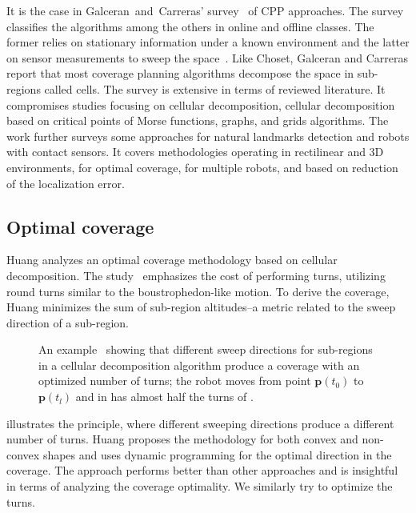 It is the case in Galceran~and~Carreras' survey~\citep{galceran2013survey} of CPP approaches. The survey classifies the algorithms among the others in online and offline classes. The former relies on stationary information under a known environment and the latter on sensor measurements to sweep the space~\citep{galceran2013survey}. Like Choset, Galceran and Carreras report that most coverage planning algorithms decompose the space in sub-regions called cells. The survey is extensive in terms of reviewed literature. It compromises studies focusing on cellular decomposition, cellular decomposition based on critical points of Morse functions, graphs, and grids algorithms. The work further surveys some approaches for natural landmarks detection and robots with contact sensors. It covers methodologies operating in rectilinear and 3D environments, for optimal coverage, for multiple robots, and based on reduction of the localization error.

\subsection{Optimal coverage}
\label{sec:opti-cov}

Huang analyzes an optimal coverage methodology based on cellular decomposition. The study~\citep{huang2001optimal} emphasizes the cost of performing turns, utilizing round turns similar to the boustrophedon-like motion. To derive the coverage, Huang minimizes the sum of sub-region altitudes--a metric related to the sweep direction of a sub-region. 
\begin{figure}[h]
  \centering
  \selectfont
  
  \caption[Turn optimal coverage with different sweep directions for each sub-region]{An example~\citep{huang2001optimal} showing that different sweep directions for sub-regions in a cellular decomposition algorithm produce a coverage with an optimized number of turns; the robot moves from point $\mathbf{p}(t_0)$ to $\mathbf{p}(t_l)$ and in  has almost half the turns of .}
  \label{fig:huang}
\end{figure}
 illustrates the principle, where different sweeping directions produce a different number of turns. Huang proposes the methodology for both convex and non-convex shapes and uses dynamic programming for the optimal direction in the coverage. The approach performs better than other approaches 
and is insightful in terms of analyzing the coverage optimality. We similarly try to optimize the turns.

